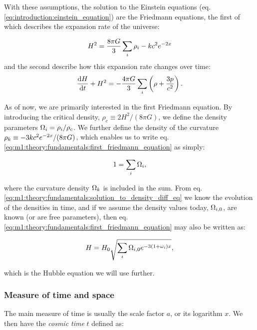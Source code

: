     With these assumptions, the solution to the Einstein equations (eq. \ref{eq:introduction:einstein_equation}) are the Friedmann equations, the first of which describes the expansion rate of the universe:

    \begin{equation}
        \label{eq:m1:theory:fundamentals:first_friedmann_equation}
        H^2 = \frac{8\pi G}{3}\sum_i\rho_i - kc^2e^{-2x} \\
    \end{equation}
    and the second describe how this expansion rate changes over time:
    \begin{equation}
        \label{eq:m1:theory:fundamentals:second_friedmann_equation}
        \dv{H}{t}+H^2 = -\frac{4\pi G}{3}\sum_i\left(\rho+\frac{3p}{c^2}\right).
    \end{equation}

    As of now, we are primarily interested in the first Friedmann equation. By introducing the critical density, $\rho_c\equiv2H^2/(8\pi G)$, we define the density parameters $\Omega_i=\rho_i/\rho_c$. We further define the density of the curvature $\rho_k\equiv-3kc^2e^{-2x}/(8\pi G)$, which enables us to write eq. \ref{eq:m1:theory:fundamentals:first_friedmann_equation} as simply:

    \begin{equation}
        1=\sum_i\Omega_i,
    \end{equation}

    where the curvature density $\Omega_k$ is included in the sum. From eq. \ref{eq:m1:theory:fundamentals:solution_to_density_diff_eq} we know the evolution of the densities in time, and if we assume the density values today, $\Omega_{i,0}$, are known (or are free parameters), then eq. \ref{eq:m1:theory:fundamentals:first_friedmann_equation} may also be written as:

    \begin{equation}\label{eq:m1:theory:fundamentals:Hubble_equation}
        H = H_0\sqrt{\sum_i\Omega_{i,0}e^{-3(1+\omega_i)x}},
    \end{equation}

    which is the Hubble equation we will use further.




\subsubsection{Measure of time and space}\label{sec:m1:measure_time_space}
    The main measure of time is usually the scale factor $a$, or its logarithm $x$. We then have the \textit{cosmic time} $t$ defined as:

